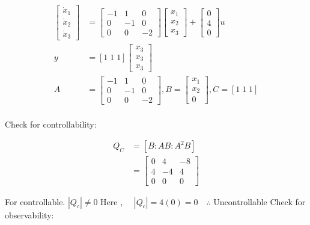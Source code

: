 \documentclass[11pt,a4paper]{article}
\begin{document}
\begin{tcolorbox}[solbox, title=Detailed Solution -- Question 106]
\[
\begin{aligned} \left[\begin{array}{c}\dot{x}_{1} \\ \dot{x}_{2} \\ \dot{x}_{3}\end{array}\right]&=\left[\begin{array}{rrr}-1 & 1 & 0 \\ 0 & -1 & 0 \\ 0 & 0 & -2\end{array}\right]\left[\begin{array}{l}x_{1} \\ x_{2} \\ x_{3}\end{array}\right]+\left[\begin{array}{l}0 \\ 4 \\ 0\end{array}\right] u \\ y&=[1 \;1 \;1 ]\left[\begin{array}{r}x_{3} \\ x_{3} \\ x_{3}\end{array}\right] \\ A&=\left[\begin{array}{rrr}-1 & 1 & 0 \\ 0 & -1 & 0 \\ 0 & 0 & -2\end{array}\right], B=\left[\begin{array}{l}x_{1} \\ x_{2} \\ 0\end{array}\right], C=\left[1\;1\;1\right] \\ \end{aligned}
\]

 Check for controllability:

\[
\begin{aligned} Q_{C} &=\left[B: A B: A^{2} B\right] \\ &=\left[\begin{array}{rrr} 0 & 4 & -8 \\ 4 & -4 & 4 \\ 0 & 0 & 0 \end{array}\right] \end{aligned}
\]

For controllable.
$\left|Q_{c}\right| \neq 0$
 Here , $\quad\left|Q_{c}\right|=4(0)=0 \quad \therefore$ Uncontrollable
 Check for observability:


\end{tcolorbox}
\end{document}
